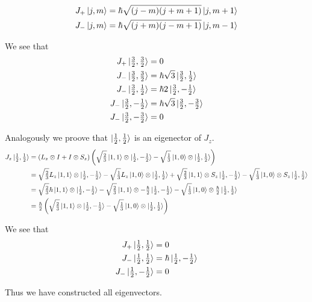 \documentclass[a4paper,german,12pt,smallheadings]{scrartcl}
\begin{document}
\begin{enumerate}[a)]
    \begin{align*}
      J_+ \ket{j, m} &= \hbar \sqrt{(j-m)(j+m+1)} \ket{j, m+1} \\
      J_- \ket{j, m} &= \hbar \sqrt{(j+m)(j-m+1)} \ket{j, m-1} \\
    \end{align*}

    We see that
    \begin{align*}
      J_+ \ket{\tfrac{3}{2}, \tfrac{3}{2}} &= 0 \\
      J_- \ket{\tfrac{3}{2}, \tfrac{3}{2}} &= \hbar \sqrt{3} \ket{\tfrac{3}{2}, \tfrac{1}{2}} \\
      J_- \ket{\tfrac{3}{2}, \tfrac{1}{2}} &= \hbar 2 \ket{\tfrac{3}{2}, -\tfrac{1}{2}} \\
      J_- \ket{\tfrac{3}{2}, -\tfrac{1}{2}} &= \hbar \sqrt{3} \ket{\tfrac{3}{2}, -\tfrac{3}{2}} \\
      J_- \ket{\tfrac{3}{2}, -\tfrac{3}{2}} &= 0
    \end{align*}

    Analogously we proove that $\ket{\tfrac{1}{2}, \tfrac{1}{2}}$ is an
    eigenector of $J_z$.
    \begin{align*}
      J_z \ket{\tfrac{1}{2}, \tfrac{1}{2}} 
      &= (L_z \otimes I + I \otimes S_z) \del{
        \sqrt{\tfrac{2}{3}}\ket{1,1} \otimes \ket{\tfrac{1}{2}, -\tfrac{1}{2}} -
        \sqrt{\tfrac{1}{3}}\ket{1,0} \otimes \ket{\tfrac{1}{2}, \tfrac{1}{2}}
      }\\
      &=
        \sqrt{\tfrac{2}{3}}L_z\ket{1,1} \otimes \ket{\tfrac{1}{2}, -\tfrac{1}{2}} -
        \sqrt{\tfrac{1}{3}}L_z\ket{1,0} \otimes \ket{\tfrac{1}{2}, \tfrac{1}{2}} +
        \sqrt{\tfrac{2}{3}}\ket{1,1} \otimes S_z\ket{\tfrac{1}{2}, -\tfrac{1}{2}} -
        \sqrt{\tfrac{1}{3}}\ket{1,0} \otimes S_z\ket{\tfrac{1}{2}, \tfrac{1}{2}} \\
      &=
        \sqrt{\tfrac{2}{3}} \hbar \ket{1,1} \otimes \ket{\tfrac{1}{2}, -\tfrac{1}{2}} -
        \sqrt{\tfrac{2}{3}}\ket{1,1} \otimes -\tfrac{\hbar}{2} \ket{\tfrac{1}{2}, -\tfrac{1}{2}} -
        \sqrt{\tfrac{1}{3}}\ket{1,0} \otimes \tfrac{\hbar}{2} \ket{\tfrac{1}{2}, \tfrac{1}{2}} \\
      &= \tfrac{\hbar}{2} \del{
        \sqrt{\tfrac{2}{3}}\ket{1,1} \otimes \ket{\tfrac{1}{2}, -\tfrac{1}{2}} -
        \sqrt{\tfrac{1}{3}}\ket{1,0} \otimes \ket{\tfrac{1}{2}, \tfrac{1}{2}}
      }\\
    \end{align*}

    We see that
    \begin{align*}
      J_+ \ket{\tfrac{1}{2}, \tfrac{1}{2}} &= 0 \\
      J_- \ket{\tfrac{1}{2}, \tfrac{1}{2}} &= \hbar \ket{\tfrac{1}{2}, -\tfrac{1}{2}} \\
      J_- \ket{\tfrac{1}{2}, -\tfrac{1}{2}} &= 0
    \end{align*}

    Thus we have constructed all eigenvectors.


\end{enumerate}
\end{document}
